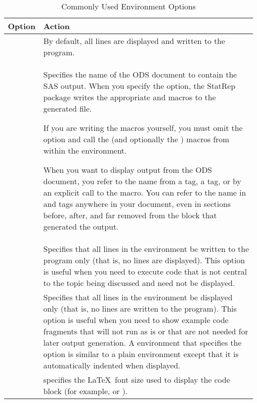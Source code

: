 \documentclass[article,oneside]{memoir}
\newcommand*{\StatRep}{\textsf{StatRep}\xspace}
\begin{document}
\begin{table}[H]
\caption{Commonly Used  Environment Options}\label{scopt}
\begin{tabular}{lP{3.75in}}
\hline
\textbf{Option}  &  \textbf{Action} \\
\hline
& By default, all lines are displayed and written to the program. \\[0.5\baselineskip]
      & 
         Specifies the name of the ODS document to contain the SAS output. 
         When you specify the  option, the \StatRep package writes the 
         appropriate  and  macros to the generated file. 
         
         If you are writing the macros yourself, you must omit the  option
         and call the  (and optionally the ) macros from within the
          environment.
         
         When you want to display output from the ODS document, you refer
         to the  name from a  tag, a  tag, or by
         an explicit call to the  macro. You can refer to the name in 
          and  tags
         anywhere in your document, even in sections before, after, and far removed from 
         the  block that generated the output.
\\[0.5\baselineskip]
                   
     & Specifies that  all lines in the environment
                     be written to the program only
                (that is, no lines are displayed). This option is useful when you need
                to execute code that is not central to the topic being discussed and need not
                be displayed.
\\[0.5\baselineskip]
     & 
                  Specifies that all lines in the environment
                  be displayed only (that is, no lines are written to the program). 
                This option is
                useful when you need to show example code 
                fragments that will not run as is or that are not needed
                for later output generation. A  environment that specifies
                the  option is similar to a plain  environment except
                that it is automatically indented when displayed.
\\[0.5\baselineskip]
   & 
        specifies the \LaTeX\ font size used to display the
       code block (for example,  or ).
\\
\hline
\end{tabular}
\end{table}
  
\end{document}
